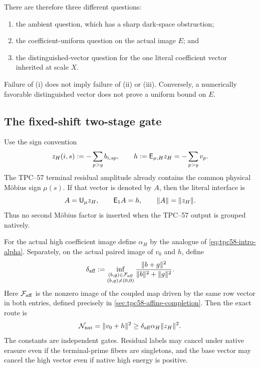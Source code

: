 There are therefore three different questions:
\begin{enumerate}[label=(\roman*)]
 \item the ambient question, which has a sharp dark-space obstruction;
 \item the coefficient-uniform question on the actual image \(E\); and
 \item the distinguished-vector question for the one literal coefficient
       vector inherited at scale \(X\).
\end{enumerate}
Failure of (i) does not imply failure of (ii) or (iii).  Conversely, a
numerically favorable distinguished vector does not prove a uniform
bound on \(E\).

\subsection{The fixed-shift two-stage gate}

Use the sign convention
\begin{equation}
 z_H(i,s):=-\sum_{p>y}b_{i,sp},
 \qquad
 h:=\mathsf E_{\mu,H}z_H=-\sum_{p>y}v_p.
 \label{eq:tpc58-intro-high-convention}
\end{equation}
The TPC--57 terminal residual amplitude already contains the common
physical M\"obius sign \(\mu(s)\).  If that vector is denoted by \(A\),
then the literal interface is
\begin{equation}
 A=\mathsf U_\mu z_H,
 \qquad
 \mathsf E_1A=h,
 \qquad
 \|A\|=\|z_H\|.
 \label{eq:tpc58-intro-terminal-interface}
\end{equation}
Thus no second M\"obius factor is inserted when the TPC--57 output is
grouped natively.

For the actual high coefficient image define \(\alpha_H\) by the
analogue of \eqref{eq:tpc58-intro-alpha}.  Separately, on the actual
paired image of \(v_0\) and \(h\), define
\begin{equation}
 \delta_{\rm aff}
 :=\inf_{\substack{(b,g)\in\mathcal F_{\rm aff}\\(b,g)\ne(0,0)}}
   \frac{\|b+g\|^2}{\|b\|^2+\|g\|^2}.
 \label{eq:tpc58-intro-delta}
\end{equation}
Here \(\mathcal F_{\rm aff}\) is the nonzero image of the coupled map driven by
the same row vector in both entries, defined precisely in
\cref{sec:tpc58-affine-completion}.  Then the exact route is
\begin{equation}
 \mathcal N_{\rm nat}
 =\|v_0+h\|^2
 \ge \delta_{\rm aff}\alpha_H\|z_H\|^2.
 \label{eq:tpc58-intro-two-stage}
\end{equation}
The constants are independent gates.  Residual labels may cancel under
native erasure even if the terminal-prime fibers are singletons, and the
base vector may cancel the high vector even if native high energy is
positive.

